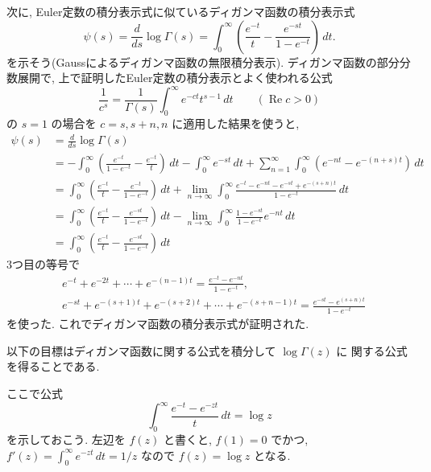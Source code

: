 \documentclass[12pt,twoside]{jarticle}
\renewcommand\Re{\operatorname{Re}}
\theoremstyle{jplain}
\theoremstyle{jplain}
\theoremstyle{jplain}
\numberwithin{theorem}{section}
\numberwithin{equation}{section}
\numberwithin{figure}{section}
\numberwithin{table}{section}
\begin{document}
次に, Euler定数の積分表示式に似ているディガンマ函数の積分表示式
\[
\psi(s)=\frac{d}{ds}\log\Gamma(s)
=\int_0^\infty\left(\frac{e^{-t}}{t}-\frac{e^{-st}}{1-e^{-t}}\right)\,dt.
\]
を示そう(Gaussによるディガンマ函数の無限積分表示). 
ディガンマ函数の部分分数展開で, 
上で証明したEuler定数の積分表示とよく使われる公式
\[
\frac{1}{c^s} = \frac{1}{\Gamma(s)}\int_0^\infty e^{-ct}t^{s-1}\,dt
\qquad (\Re c>0)
\tag{$\$$}
\]
の $s=1$ の場合を $c=s,s+n,n$ に適用した結果を使うと, 
\begin{align*}
\psi(s)
&
=\frac{d}{ds}\log\Gamma(s)
\\ &
=
-\int_0^\infty\left(\frac{e^{-t}}{1-e^{-t}}-\frac{e^{-t}}{t}\right)\,dt
-\int_0^\infty e^{-st}\,dt
+\sum_{n=1}^\infty \int_0^\infty (e^{-nt}-e^{-(n+s)t})\,dt
\\ &
=
\int_0^\infty\left(\frac{e^{-t}}{t}-\frac{e^{-t}}{1-e^{-t}}\right)\,dt
+\lim_{n\to\infty}
\int_0^\infty \frac{e^{-t}-e^{-nt}-e^{-st}+e^{-(s+n)t}}{1-e^{-t}}\,dt
\\ &
=
\int_0^\infty\left(\frac{e^{-t}}{t}-\frac{e^{-st}}{1-e^{-t}}\right)\,dt
-\lim_{n\to\infty}
\int_0^\infty \frac{1-e^{-st}}{1-e^{-t}} e^{-nt} \,dt
\\ &
=
\int_0^\infty\left(\frac{e^{-t}}{t}-\frac{e^{-st}}{1-e^{-t}}\right)\,dt
\end{align*}
3つ目の等号で
\begin{align*}
&
e^{-t}+e^{-2t}+\cdots+e^{-(n-1)t}=\frac{e^{-t}-e^{-nt}}{1-e^{-t}}, 
\\ &
e^{-st}+e^{-(s+1)t}+e^{-(s+2)t}+\cdots+e^{-(s+n-1)t}=\frac{e^{-st}-e^{(s+n)t}}{1-e^{-t}}
\end{align*}
を使った. これでディガンマ函数の積分表示式が証明された.

以下の目標はディガンマ函数に関する公式を積分して $\log\Gamma(z)$ に
関する公式を得ることである.

ここで公式
\[
  \int_0^\infty \frac{e^{-t}-e^{-zt}}{t}\,dt = \log z
\tag{$*$}
\]
を示しておこう. 左辺を $f(z)$ と書くと, $f(1)=0$ でかつ, 
$f'(z)=\int_0^\infty e^{-zt}\,dt=1/z$ なので $f(z)=\log z$ となる.
\end{document}
